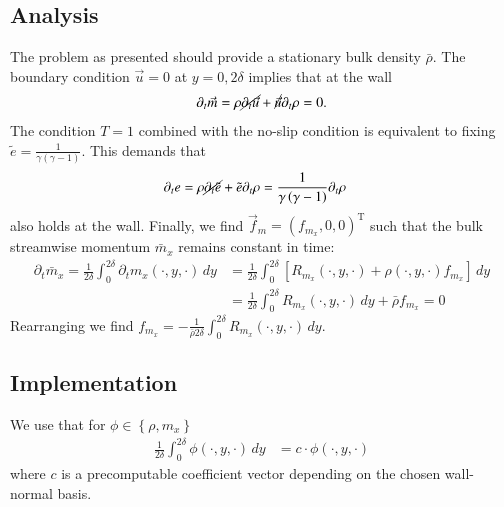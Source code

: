 \documentclass[letterpaper,11pt,nointlimits,reqno]{amsart}
\begin{document}
\subsection*{Analysis}

The problem as presented should provide a stationary bulk density $\bar{\rho}$.
The boundary condition $\vec{u} = 0$ at $y = 0,2\delta$ implies that at the
wall
\begin{align}
  \partial_{t} \vec{m}
  =   \rho \cancel{\partial_{t} \vec{u}}
    + \cancel{\vec{u}} \partial_{t} \rho
  = 0.
\end{align}
The condition $T=1$ combined with the no-slip condition is equivalent to fixing
$\tilde{e}=\frac{1}{\gamma\left(\gamma-1\right)}$.  This demands that
\begin{align}
  \partial_{t} e
  &=  \rho \cancel{\partial_{t} \tilde{e}}
    + \tilde{e} \partial_{t} \rho
  = \frac{1}{\gamma\left(\gamma-1\right)} \partial_{t} \rho
\end{align}
also holds at the wall.  Finally, we find $\vec{f}_{m} =
\left(f_{m_x},0,0\right)^{\textrm{T}}$ such that the bulk streamwise momentum
$\bar{m}_{x}$ remains constant in time:
\begin{align}
  \partial_{t} \bar{m}_x
   = \frac{1}{2\delta} \int_{0}^{2\delta}
     \partial_{t} m_{x} \!\left(\cdot,y,\cdot\right) \, dy
  &= \frac{1}{2\delta} \int_{0}^{2\delta}
     \left[  R_{m_x}\!\left(\cdot,y,\cdot\right)
           + \rho\!\left(\cdot,y,\cdot\right)  f_{m_x}
     \right] \, dy
  \\
  &= \frac{1}{2\delta} \int_{0}^{2\delta}
     R_{m_x}\!\left(\cdot,y,\cdot\right) \, dy + \bar{\rho} f_{m_x}
   = 0
\end{align}
Rearranging we find $f_{m_x} = - \frac{1}{\bar{\rho}2\delta}
\int_{0}^{2\delta} R_{m_x}\!\left(\cdot,y,\cdot\right) \, dy$.

\subsection*{Implementation}

We use that for
$\phi\in\left\{\rho,m_{x}\right\}$
\begin{align}
  \frac{1}{2\delta} \int_{0}^{2\delta} \phi\!\left(\cdot,y,\cdot\right)\,dy
  &=
  c \cdot \phi\!\left(\cdot,y,\cdot\right)
\end{align}
where $c$ is a precomputable coefficient vector depending on the chosen
wall-normal basis.
\end{document}
